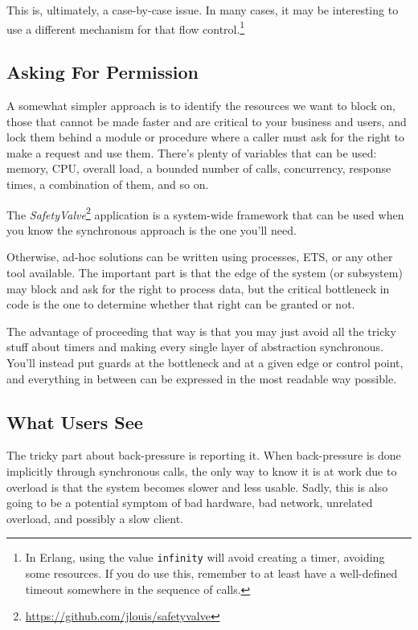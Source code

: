 \documentclass[11pt, oneside]{book}   	%
\newcommand{\term}[1]{\Verb`#1`}
\begin{document}
This is, ultimately, a case-by-case issue. In many cases, it may be interesting to use a different mechanism for that flow control.\footnote{In Erlang, using the value \term{infinity} will avoid creating a timer, avoiding some resources. If you do use this, remember to at least have a well-defined timeout somewhere in the sequence of calls.}

\subsection{Asking For Permission}

A somewhat simpler approach is to identify the resources we want to block on, those that cannot be made faster and are critical to your business and users, and lock them behind a module or procedure where a caller must ask for the right to make a request and use them. There's plenty of variables that can be used: memory, CPU, overall load, a bounded number of calls, concurrency, response times, a combination of them, and so on.

The \emph{SafetyValve}\footnote{\href{https://github.com/jlouis/safetyvalve}{https://github.com/jlouis/safetyvalve}} application is a system-wide framework that can be used when you know the synchronous approach is the one you'll need.

Otherwise, ad-hoc solutions can be written using processes, ETS, or any other tool available. The important part is that the edge of the system (or subsystem) may block and ask for the right to process data, but the critical bottleneck in code is the one to determine whether that right can be granted or not.

The advantage of proceeding that way is that you may just avoid all the tricky stuff about timers and making every single layer of abstraction synchronous. You'll instead put guards at the bottleneck and at a given edge or control point, and everything in between can be expressed in the most readable way possible.

\subsection{What Users See}

The tricky part about back-pressure is reporting it. When back-pressure is done implicitly through synchronous calls, the only way to know it is at work due to overload is that the system becomes slower and less usable. Sadly, this is also going to be a potential symptom of bad hardware, bad network, unrelated overload, and possibly a slow client.
\end{document}
